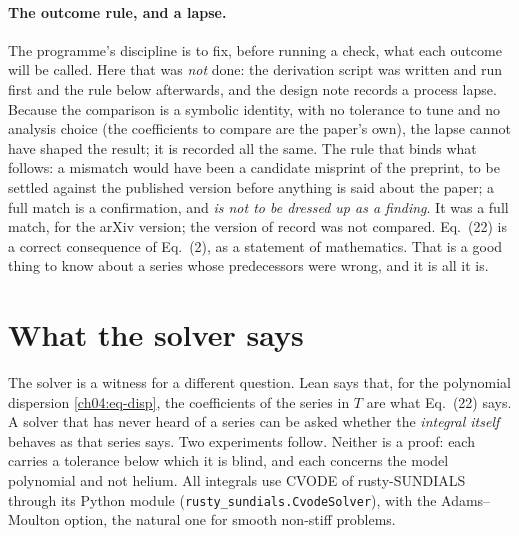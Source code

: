 \paragraph{The outcome rule, and a lapse.}
The programme's discipline is to fix, before running a check, what each outcome will be called.
Here that was \emph{not} done: the derivation script was written and run first and the rule below afterwards, and the design note records a process lapse.
Because the comparison is a symbolic identity, with no tolerance to tune and no analysis choice (the coefficients to compare are the paper's own), the lapse cannot have shaped the result; it is recorded all the same.
The rule that binds what follows: a mismatch would have been a candidate misprint of the preprint, to be settled against the published version before anything is said about the paper; a full match is a confirmation, and \emph{is not to be dressed up as a finding}.
It was a full match, for the arXiv version; the version of record was not compared.
Eq.~(22) is a correct consequence of Eq.~(2), as a statement of mathematics.
That is a good thing to know about a series whose predecessors were wrong, and it is all it is.


\section{What the solver says}\label{ch04:sec-solver}

The solver is a witness for a different question.
Lean says that, for the polynomial dispersion \eqref{ch04:eq-disp}, the coefficients of the series in $T$ are what Eq.~(22) says.
A solver that has never heard of a series can be asked whether the \emph{integral itself} behaves as that series says.
Two experiments follow.
Neither is a proof: each carries a tolerance below which it is blind, and each concerns the model polynomial and not helium.
All integrals use CVODE of rusty-SUNDIALS through its Python module (\texttt{rusty\_sundials.CvodeSolver}), with the Adams--Moulton option, the natural one for smooth non-stiff problems.

